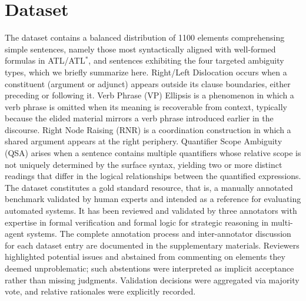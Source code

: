 \section{Dataset}
\label{sec:dataset}
The dataset contains a balanced distribution of 1100 elements comprehensing simple sentences, namely those most syntactically aligned with well-formed formulas in ATL/ATL$^\ast$, and sentences exhibiting the four targeted ambiguity types, which we briefly summarize here. Right/Left Dislocation occurs when a constituent (argument or adjunct) appears outside its clause boundaries, either preceding or following it. Verb Phrase (VP) Ellipsis is a phenomenon in which a verb phrase is omitted when its meaning is recoverable from context, typically because the elided material mirrors a verb phrase introduced earlier in the discourse. Right Node Raising (RNR) is a coordination construction in which a shared argument appears at the right periphery. Quantifier Scope Ambiguity (QSA) arises when a sentence contains multiple quantifiers whose relative scope is not uniquely determined by the surface syntax, yielding two or more distinct readings that differ in the logical relationships between the quantified expressions. The dataset constitutes a gold standard resource, that is, a manually annotated benchmark validated by human experts and intended as a reference for evaluating automated systems. It has been reviewed and validated by three annotators with expertise in formal verification and formal logic for strategic reasoning in multi-agent systems. The complete annotation process and inter-annotator discussion for each dataset entry are documented in the supplementary materials. Reviewers highlighted potential issues and abstained from commenting on elements they deemed unproblematic; such abstentions were interpreted as implicit acceptance rather than missing judgments. Validation decisions were aggregated via majority vote, and relative rationales were explicitly recorded. 

